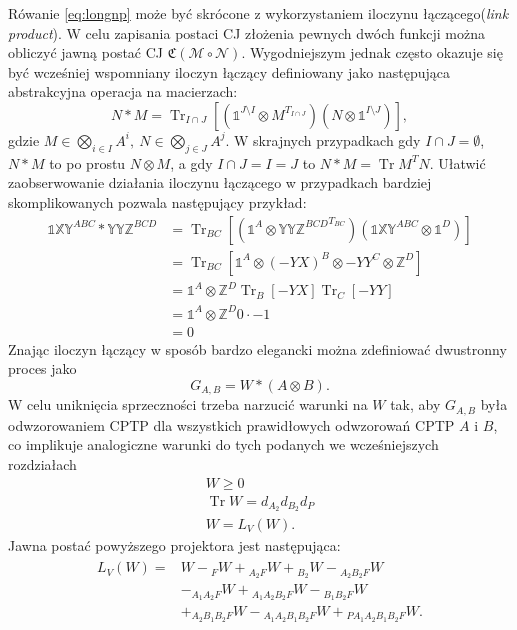 \documentclass[10pt]{article} %
\DeclareMathOperator{\Trs}{Tr}
\newcommand{\X}{\mathbb{X}}
\newcommand{\Y}{\mathbb{Y}}
\newcommand{\Z}{\mathbb{Z}}
\newcommand{\I}{\mathbb{1}}
\newcommand{\MCJ}{\mathfrak{C}}
\begin{document}
Rówanie \eqref{eq:longnp} może być skrócone z wykorzystaniem iloczynu łączącego(\textit{link product}).
W celu zapisania postaci CJ złożenia pewnych dwóch funkcji można obliczyć jawną postać CJ $\MCJ(\mathcal{M} \circ \mathcal{N})$. Wygodniejszym
jednak często okazuje się być wcześniej wspomniany iloczyn łączący definiowany jako następująca abstrakcyjna operacja na macierzach:
\begin{equation}
N * M = \Trs_{I\cap J}\left[ (\I^{J\setminus I} \otimes M^{T_{I\cap J}})(N \otimes \I^{I\setminus J})\right],
\end{equation}
gdzie $M \in \bigotimes_{i \in I} A^i,~N \in \bigotimes_{j \in J} A^j$. W skrajnych przypadkach gdy $I \cap J = \emptyset$, $N*M$ to po prostu $N \otimes M$, a
gdy $I \cap J = I = J$ to $N * M = \Trs M^T N$. Ułatwić zaobserwowanie działania iloczynu łączącego w przypadkach bardziej skomplikowanych pozwala następujący przykład:
\begin{equation}
\begin{split}
\I\X\Y^{ABC} * \Y\Y\Z^{BCD} &= \Trs_{BC} \left[ \left(\I^{A} \otimes {\Y\Y\Z^{BCD}}^{T_{BC}}\right)\left(\I\X\Y^{ABC} \otimes \I^D\right)\right] \\
&= \Trs_{BC} \left[ \I^A \otimes (-YX)^{B} \otimes {-YY}^{C} \otimes \Z^{D}\right] \\
&= \I^{A} \otimes \Z^{D} \Trs_{B} \left[ -YX \right]\Trs_{C}\left[-YY\right] \\
&= \I^{A} \otimes \Z^{D} 0 \cdot -1 \\
&= 0
\end{split}
\end{equation}
Znając iloczyn łączący w sposób bardzo elegancki można zdefiniować dwustronny proces jako
\begin{equation}
G_{A,B} = W * (A \otimes B).
\end{equation}
W celu uniknięcia sprzeczności trzeba narzucić warunki na $W$ tak, aby $G_{A,B}$ była odwzorowaniem CPTP dla wszystkich prawidłowych odwzorowań CPTP $A$ i $B$, co implikuje analogiczne warunki do tych podanych we wcześniejszych rozdziałach
\begin{gather}
W \geq 0 \\
\Trs W = d_{A_2}d_{B_2}d_P \\
W = L_V(W).
\end{gather} 
Jawna postać powyższego projektora jest następująca:
\begin{align}
\begin{split}
L_V(W) =& W -{}_FW + {}_{A_2F}W + {}_{B_2}W - {}_{A_2B_2F}W\\ &- {}_{A_1A_2F}W + {}_{A_1A_2B_2F}W - {}_{B_1B_2F}W \\&+ {}_{A_2B_1B_2F}W - {}_{A_1A_2B_1B_2F}W + {}_{PA_1A_2B_1B_2F}W.
\end{split}
\end{align}
\end{document}
